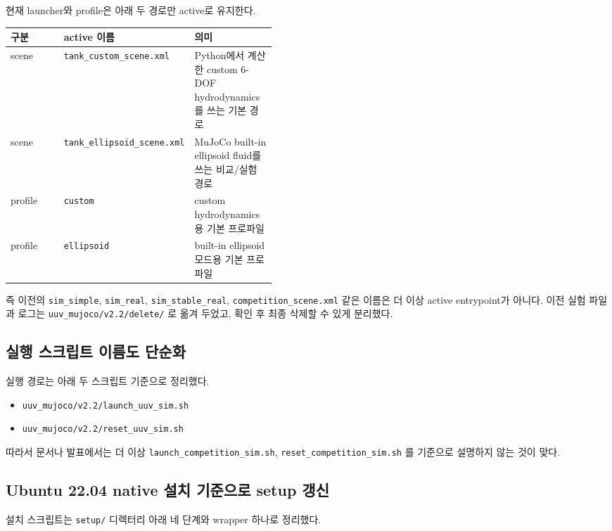 \documentclass[11pt,a4paper]{article}
\newcommand{\code}[1]{\nolinkurl{#1}}
\begin{document}
현재 launcher와 profile은 아래 두 경로만 active로 유지한다.

\begin{center}
\small
\begin{tabularx}{\linewidth}{>{\raggedright\arraybackslash}p{0.20\linewidth}>{\raggedright\arraybackslash}p{0.24\linewidth}Y}
\toprule
구분 & active 이름 & 의미 \\
\midrule
scene & \code{tank\_custom\_scene.xml} & Python에서 계산한 custom 6-DOF hydrodynamics를 쓰는 기본 경로 \\
scene & \code{tank\_ellipsoid\_scene.xml} & MuJoCo built-in ellipsoid fluid를 쓰는 비교/실험 경로 \\
profile & \code{custom} & custom hydrodynamics용 기본 프로파일 \\
profile & \code{ellipsoid} & built-in ellipsoid 모드용 기본 프로파일 \\
\bottomrule
\end{tabularx}
\end{center}

즉 이전의 \code{sim\_simple}, \code{sim\_real}, \code{sim\_stable\_real}, \code{competition\_scene.xml} 같은 이름은 더 이상 active entrypoint가 아니다. 이전 실험 파일과 로그는 \code{uuv\_mujoco/v2.2/delete/} 로 옮겨 두었고, 확인 후 최종 삭제할 수 있게 분리했다.

\subsection{실행 스크립트 이름도 단순화}

실행 경로는 아래 두 스크립트 기준으로 정리했다.

\begin{itemize}[leftmargin=2em]
  \item \code{uuv\_mujoco/v2.2/launch\_uuv\_sim.sh}
  \item \code{uuv\_mujoco/v2.2/reset\_uuv\_sim.sh}
\end{itemize}

따라서 문서나 발표에서는 더 이상 \code{launch\_competition\_sim.sh}, \code{reset\_competition\_sim.sh} 를 기준으로 설명하지 않는 것이 맞다.

\subsection{Ubuntu 22.04 native 설치 기준으로 setup 갱신}

설치 스크립트는 \code{setup/} 디렉터리 아래 네 단계와 wrapper 하나로 정리했다.
\end{document}
